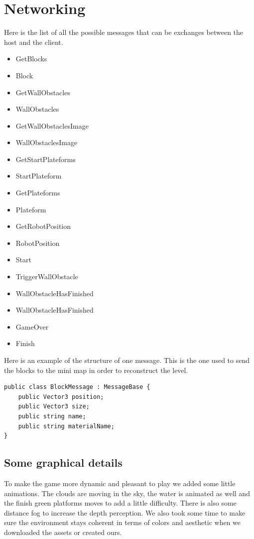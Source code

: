 \documentclass[12pt]{article}
\begin{document}
\section{Networking}
Here is the list of all the possible messages that can be exchanges between the host and the client.

\begin{itemize}  
\item GetBlocks 
\item Block
\item GetWallObstacles 
\item WallObstacles
\item GetWallObstaclesImage 
\item WallObstaclesImage
\item GetStartPlateforms 
\item StartPlateform
\item GetPlateforms 
\item Plateform
\item GetRobotPosition
\item RobotPosition
\item Start
\item TriggerWallObstacle
\item WallObstacleHasFinished
\item WallObstacleHasFinished
\item GameOver
\item Finish
\end{itemize}

Here is an example of the structure of one message. This is the one used to send the blocks to the mini map in order to reconstruct the level.

\begin{lstlisting}
public class BlockMessage : MessageBase {
	public Vector3 position;
	public Vector3 size;
	public string name;
	public string materialName;
}
\end{lstlisting}

\subsection{Some graphical details}
To make the game more dynamic and pleasant to play we added some little animations. The clouds are moving in the sky, the water is animated as well and the finish green platforms moves to add a little difficulty. There is also some distance fog to increase the depth perception. We also took some time to make sure the environment stays coherent in terms of colors and aesthetic when we downloaded the assets or created ours.  
\end{document}
